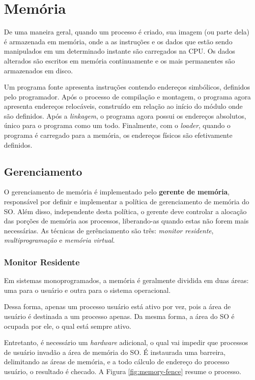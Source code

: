 \chapter{Memória}
De uma maneira geral, quando um processo é criado, sua imagem (ou parte dela) é armazenada em memória, onde a as instruções e os dados que estão sendo manipulados em um determinado instante são carregados na CPU. Os dados alterados são escritos em memória continuamente e os mais permanentes são armazenados em disco.

Um programa fonte apresenta instruções contendo endereços simbólicos, definidos pelo programador. Após o processo de compilação e montagem, o programa agora apresenta endereços relocáveis, construído em relação ao início do módulo onde são definidos. Após a \textit{linkagem}, o programa agora possui os endereços absolutos, único para o programa como um todo. Finalmente, com o \textit{loader}, quando o programa é carregado para a memória, os endereços físicos são efetivamente definidos. %

\section{Gerenciamento}
O gerenciamento de memória é implementado pelo \textbf{gerente de memória}, responsável por definir e implementar a política de gerenciamento de memória do SO. Além disso, independente desta política, o gerente deve controlar a alocação das porções de memória aos processos, liberando-as quando estas não forem mais necessárias. As técnicas de gerênciamento são três: \textit{monitor residente}, \textit{multiprogramação} e \textit{memória virtual}.






\subsection{Monitor Residente}
Em sistemas monoprogramados, a memória é geralmente dividida em duas áreas: uma para o usuário e outra para o sistema operacional.

Dessa forma, apenas um processo usuário está ativo por vez, pois a área de usuário é destinada a um processo apenas. Da mesma forma, a área do SO é ocupada por ele, o qual está sempre ativo.

Entretanto, é necessário um \textit{hardware} adicional, o qual vai impedir que processos de usuário invadão a área de memória do SO. É instaurada uma barreira, delimitando as áreas de memória, e a todo cálculo de endereço do processo usuário, o resultado é checado. A Figura \ref{fig:memory-fence} resume o processo.


